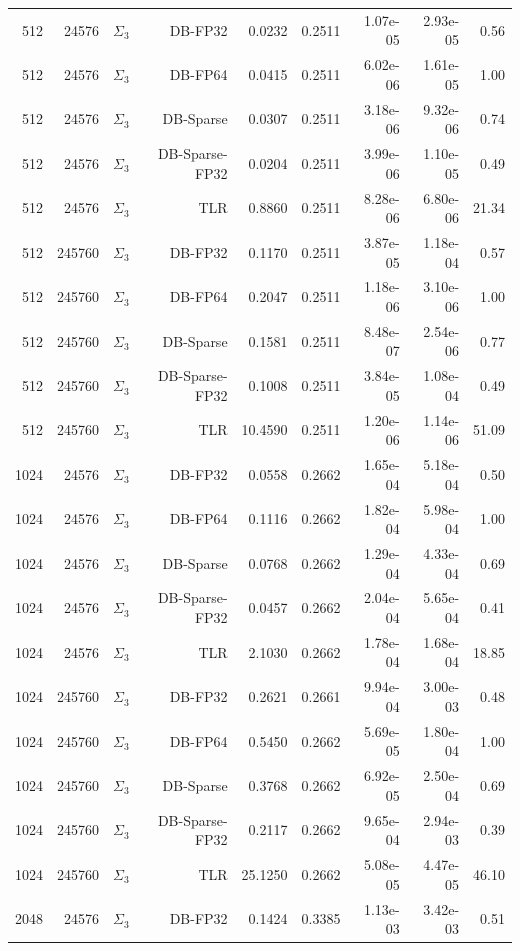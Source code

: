 \begin{tabular}{|r|r|r|r|r|r|r|r|r|}
  512 & 24576 & $\Sigma_3$ & DB-FP32 & 0.0232 & 0.2511 & 1.07e-05 & 2.93e-05 & 0.56 \\
  512 & 24576 & $\Sigma_3$ & DB-FP64 & 0.0415 & 0.2511 & 6.02e-06 & 1.61e-05 & 1.00 \\
  512 & 24576 & $\Sigma_3$ & DB-Sparse & 0.0307 & 0.2511 & 3.18e-06 & 9.32e-06 & 0.74 \\
  512 & 24576 & $\Sigma_3$ & DB-Sparse-FP32 & 0.0204 & 0.2511 & 3.99e-06 & 1.10e-05 & 0.49 \\
  512 & 24576 & $\Sigma_3$ & TLR & 0.8860 & 0.2511 & 8.28e-06 & 6.80e-06 & 21.34 \\
  512 & 245760 & $\Sigma_3$ & DB-FP32 & 0.1170 & 0.2511 & 3.87e-05 & 1.18e-04 & 0.57 \\
  512 & 245760 & $\Sigma_3$ & DB-FP64 & 0.2047 & 0.2511 & 1.18e-06 & 3.10e-06 & 1.00 \\
  512 & 245760 & $\Sigma_3$ & DB-Sparse & 0.1581 & 0.2511 & 8.48e-07 & 2.54e-06 & 0.77 \\
  512 & 245760 & $\Sigma_3$ & DB-Sparse-FP32 & 0.1008 & 0.2511 & 3.84e-05 & 1.08e-04 & 0.49 \\
  512 & 245760 & $\Sigma_3$ & TLR & 10.4590 & 0.2511 & 1.20e-06 & 1.14e-06 & 51.09 \\
  1024 & 24576 & $\Sigma_3$ & DB-FP32 & 0.0558 & 0.2662 & 1.65e-04 & 5.18e-04 & 0.50 \\
  1024 & 24576 & $\Sigma_3$ & DB-FP64 & 0.1116 & 0.2662 & 1.82e-04 & 5.98e-04 & 1.00 \\
  1024 & 24576 & $\Sigma_3$ & DB-Sparse & 0.0768 & 0.2662 & 1.29e-04 & 4.33e-04 & 0.69 \\
  1024 & 24576 & $\Sigma_3$ & DB-Sparse-FP32 & 0.0457 & 0.2662 & 2.04e-04 & 5.65e-04 & 0.41 \\
  1024 & 24576 & $\Sigma_3$ & TLR & 2.1030 & 0.2662 & 1.78e-04 & 1.68e-04 & 18.85 \\
  1024 & 245760 & $\Sigma_3$ & DB-FP32 & 0.2621 & 0.2661 & 9.94e-04 & 3.00e-03 & 0.48 \\
  1024 & 245760 & $\Sigma_3$ & DB-FP64 & 0.5450 & 0.2662 & 5.69e-05 & 1.80e-04 & 1.00 \\
  1024 & 245760 & $\Sigma_3$ & DB-Sparse & 0.3768 & 0.2662 & 6.92e-05 & 2.50e-04 & 0.69 \\
  1024 & 245760 & $\Sigma_3$ & DB-Sparse-FP32 & 0.2117 & 0.2662 & 9.65e-04 & 2.94e-03 & 0.39 \\
  1024 & 245760 & $\Sigma_3$ & TLR & 25.1250 & 0.2662 & 5.08e-05 & 4.47e-05 & 46.10 \\
  2048 & 24576 & $\Sigma_3$ & DB-FP32 & 0.1424 & 0.3385 & 1.13e-03 & 3.42e-03 & 0.51 \\

\end{tabular}

